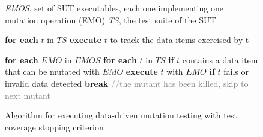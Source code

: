 

\begin{figure}[tb]

\begin{algorithmic}[1]

\scriptsize
\Require \emph{EMOS}, set of SUT executables, each one implementing one mutation operation (EMO)
\Require \emph{TS}, the test suite of the SUT


\State \textbf{for each} $t$ in $TS$ \label{alg:prioritize:prel}
\State \hspace{5 mm} \textbf{execute} $t$ to track the data items exercised by t

\State \textbf{for each} $EMO$ in $EMOS$ \label{alg:dataProcess:repeat}
\State \hspace{5 mm} \textbf{for each} $t$ in $TS$ \label{alg:prioritize:t}
\State \hspace{10 mm} \textbf{if} $t$ contains a data item that can be mutated with $EMO$ \label{alg:prioritize:cove}
\State \hspace{15 mm} \textbf{execute} $t$ with $EMO$
\State \hspace{15 mm} \textbf{if} $t$ fails or invalid data detected
\State \hspace{20 mm} \textbf{break} \textcolor{gray}{//the mutant has been killed, skip to next mutant}\label{alg:prioritize:stop}



\end{algorithmic}
\vspace{-3mm}
\caption{Algorithm for executing data-driven mutation testing with test coverage stopping criterion}
\label{alg:dataProcess}
\end{figure}


